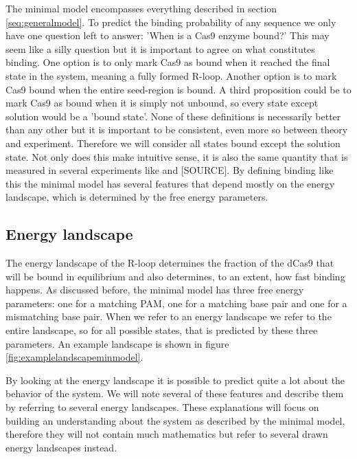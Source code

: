 The minimal model encompasses everything described in section \ref{seq:generalmodel}. To predict the binding probability of any sequence we only have one question left to answer: 'When is a Cas9 enzyme bound?' This may seem like a silly question but it is important to agree on what constitutes binding. One option is to only mark Cas9 as bound when it reached the final state in the system, meaning a fully formed R-loop. Another option is to mark Cas9 bound when the entire seed-region is bound. A third proposition could be to mark Cas9 as bound when it is simply not unbound, so every state except solution would be a 'bound state'. None of these definitions is necessarily better than any other but it is important to be consistent, even more so between theory and experiment. Therefore we will consider all states bound except the solution state. Not only does this make intuitive sense, it is also the same quantity that is measured in several experiments like \citep{PNAS} and [SOURCE]. By defining binding like this the minimal model has several features that depend mostly on the energy landscape, which is determined by the free energy parameters.

\subsection{Energy landscape}
The energy landscape of the R-loop determines the fraction of the dCas9 that will be bound in equilibrium and also determines, to an extent, how fast binding happens. As discussed before, the minimal model has three free energy parameters: one for a matching PAM, one for a matching base pair and one for a mismatching base pair. When we refer to an energy landscape we refer to the entire landscape, so for all possible states, that is predicted by these three parameters. An example landscape is shown in figure \ref{fig:examplelandscapeminmodel}. %


By looking at the energy landscape it is possible to predict quite a lot about the behavior of the system. We will note several of these features and describe them by referring to several energy landscapes. These explanations will focus on building an understanding about the system as described by the minimal model, therefore they will not contain much mathematics but refer to several drawn energy landscapes instead.

